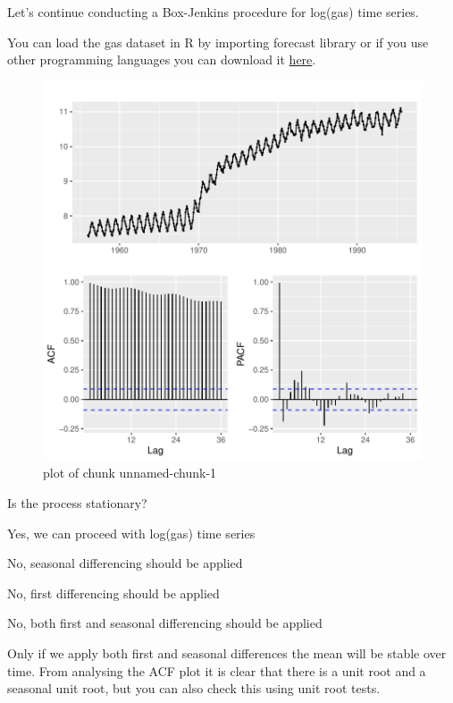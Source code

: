 
\begin{question}
Let's continue conducting a Box-Jenkins procedure for log(gas) time series.

You can load the gas dataset in R by importing forecast library or if you use other programming languages you can download it \href{https://github.com/vincentarelbundock/Rdatasets/blob/master/csv/forecast/gas.csv}{here}.

\begin{figure}[H]
\centering
\includegraphics{unnamed-chunk-1-1.pdf}
\caption{plot of chunk unnamed-chunk-1}
\end{figure}

Is the process stationary?
\begin{answerlist}
  \item Yes, we can proceed with log(gas) time series
  \item No, seasonal differencing should be applied
  \item No, first differencing should be applied
  \item No, both first and seasonal differencing should be applied
\end{answerlist}
\end{question}

\begin{solution}
Only if we apply both first and seasonal differences the mean will be stable over time. From analysing the ACF plot it is clear that there is a unit root and a seasonal unit root, but you can also check this using unit root tests.
\end{solution}

